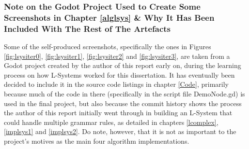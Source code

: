 \subsubsection{Note on the Godot Project Used to Create Some Screenshots in Chapter \ref{alglsys} \& Why It Has Been Included With The Rest of The Artefacts}

Some of the self-produced screenshots, specifically the ones in Figures \ref{fig:lsysiter0}, \ref{fig:lsysiter1}, \ref{fig:lsysiter2} and \ref{fig:lsysiter3}, are taken from a Godot project created by the author of this report early on, during the learning process on how L-Systems worked for this dissertation. It has eventually been decided to include it in the source code listings in chapter \ref{Code}, primarily because much of the code in there (specifically in the script file DemoNode.gd) is used in the final project, but also because the commit history shows the process the author of this report initially went through in building an L-System that could handle multiple grammar rules, as detailed in chapters \ref{lcomplex}, \ref{implsys1} and \ref{implsys2}. Do note, however, that it is not as important to the project's motives as the main four algorithm implementations. 